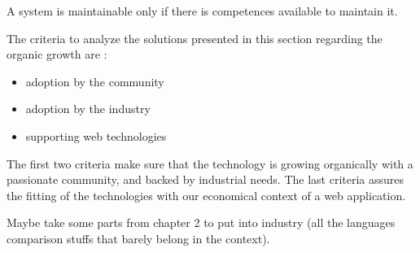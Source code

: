 A system is maintainable only if there is competences available to maintain it.

The criteria to analyze the solutions presented in this section regarding the organic growth are : 
\begin{itemize}
\item adoption by the community
\item adoption by the industry
\item supporting web technologies
\end{itemize}
The first two criteria make sure that the technology is growing organically with a passionate community, and backed by industrial needs.
The last criteria assures the fitting of the technologies with our economical context of a web application. 




Maybe take some parts from chapter 2 to put into industry (all the languages comparison stuffs that barely belong in the context).






% 



                                    \endinput


Some links I NEED to put :
--------------------------

https://glyph.twistedmatrix.com/2014/02/unyielding.html
http://calculist.org/blog/2011/12/14/why-coroutines-wont-work-on-the-web/

Transitions :
  - Linkedin - http://engineering.linkedin.com/architecture/brief-history-scaling-linkedin
  - Facebook - https://www.cs.princeton.edu/events/event/evolution-software-architecture-facebook / http://www.infoq.com/presentations/Evolution-of-Code-Design-at-Facebook
  - ... 

https://medium.com/@benorama/the-evolution-of-software-architecture-bd6ea674c477

https://en.wikipedia.org/wiki/Dataflow
https://en.wikipedia.org/wiki/Real-time_computing
https://en.wikipedia.org/wiki/Partitioned_global_address_space
https://en.wikipedia.org/wiki/SPMD


